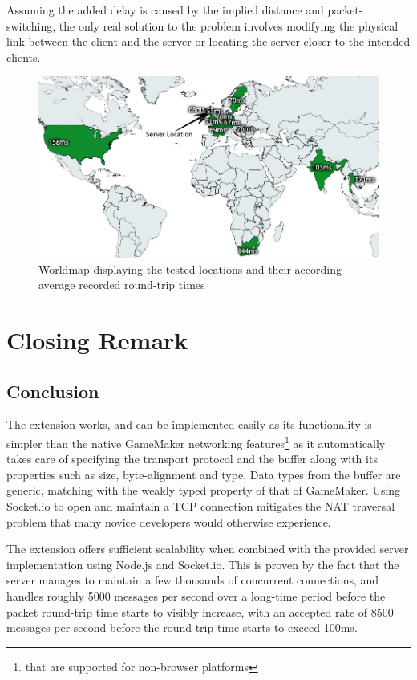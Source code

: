 \documentclass[bsc, 12pt, twoside, singlespacing, parskip, abbrevs, notimes, normalheadings, logo]{styles/infthesis}
\begin{document}
Assuming the added delay is caused by the implied distance and packet-switching, the only real solution to the problem involves modifying the physical link between the client and the server or locating the server closer to the intended clients.

\begin{figure}
\centering
\includegraphics[scale=0.45]{images/worldmap.jpg}
\caption{Worldmap displaying the tested locations and their according average recorded round-trip times}
\label{fig:worldmap}
\end{figure}





\chapter{Closing Remark}
\section{Conclusion}
The extension works, and can be implemented easily as its functionality is simpler than the native GameMaker networking features\footnote{that are supported for non-browser platforms} as it automatically takes care of specifying the transport protocol and the buffer along with its properties such as size, byte-alignment and type. Data types from the buffer are generic, matching with the weakly typed property of that of GameMaker. Using Socket.io to open and maintain a TCP connection mitigates the NAT traversal problem that many novice developers would otherwise experience.

The extension offers sufficient scalability when combined with the provided server implementation using Node.js and Socket.io. This is proven by the fact that the server manages to maintain a few thousands of concurrent connections, and handles roughly 5000 messages per second over a long-time period before the packet round-trip time starts to visibly increase, with an accepted rate of 8500 messages per second before the round-trip time starts to exceed 100ms. 
\end{document}
